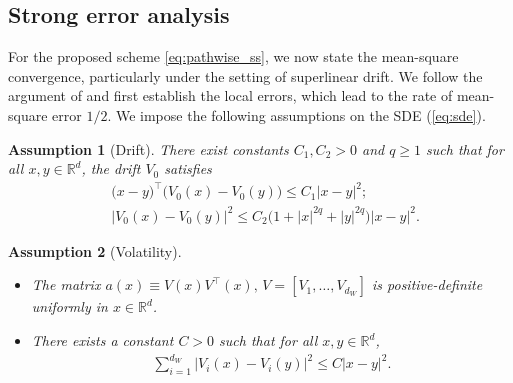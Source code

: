 \documentclass[11pt]{article}
\newtheorem{assumption}{Assumption}
\begin{document}

\subsection{Strong error analysis}\label{sec:strong.convergence}
For the proposed scheme \eqref{eq:pathwise_ss}, we now state the mean-square convergence, particularly under the setting of superlinear drift. We follow the argument of \cite{Tret:13} and first establish the local errors, which lead to the rate of mean-square error $1/2$. We impose the following assumptions on the SDE (\ref{eq:sde}). 

\begin{assumption}[Drift] \label{assump:drift}
There exist constants $C_1, C_2 > 0$ and $q \ge 1$ such that for all $x, y \in \mathbb{R}^d$, the drift $V_{0}$ satisfies
% 
\begin{align}
& \bigl( x - y \bigr)^\top \bigl( V_0 (x) - V_0 (y) \bigr) 
\le C_1 |x - y|^2; \\[0.2cm] 
& | V_{0} (x) - V_{0} (y) |^2  
\le C_2 \bigl(1 + |x|^{2q} + |y|^{2q} \bigr) | x - y |^2. 
\end{align} 
\end{assumption}

\begin{assumption}[Volatility] \label{assump:vol}
\begin{itemize}
\item[I.] The matrix $a (x) \equiv V (x) V^\top (x), \, V = [V_1, \ldots, V_{d_W}]$ is positive-definite uniformly in $x \in \mathbb{R}^d$. 
\item[II.] There exists a constant $C > 0$ such that for all $x, y \in \mathbb{R}^d$,   
\begin{align}
\sum_{i = 1}^{d_W} | V_{i} (x) 
- V_{i} (y) |^2 \le C | x - y|^2. 
\end{align}
\end{itemize}
\end{assumption}
\end{document}
